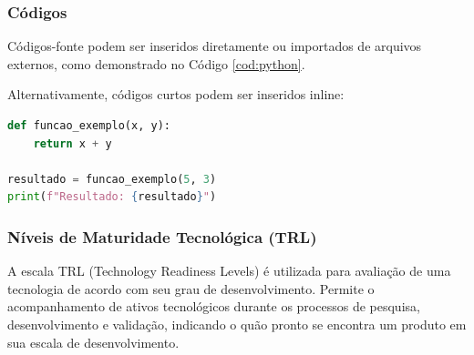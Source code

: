 \documentclass{classes/relatorio}
\begin{document}
\subsubsection{Códigos}

Códigos-fonte podem ser inseridos diretamente ou importados de arquivos externos, como demonstrado no Código \ref{cod:python}.



Alternativamente, códigos curtos podem ser inseridos inline:

\begin{lstlisting}[language=Python, caption=Código inline]
def funcao_exemplo(x, y):
    return x + y

resultado = funcao_exemplo(5, 3)
print(f"Resultado: {resultado}")
\end{lstlisting}

\subsubsection{Níveis de Maturidade Tecnológica (TRL)}

A escala TRL (Technology Readiness Levels) é utilizada para avaliação de uma tecnologia de acordo com seu grau de desenvolvimento. Permite o acompanhamento de ativos tecnológicos durante os processos de pesquisa, desenvolvimento e validação, indicando o quão pronto se encontra um produto em sua escala de desenvolvimento.
\end{document}

